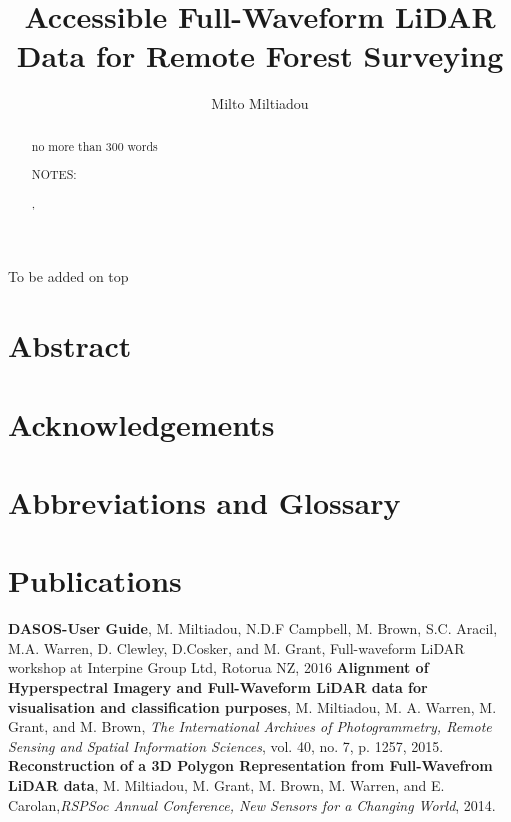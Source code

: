 \documentclass[11pt,nofootinbib]{report}
\title{Accessible Full-Waveform LiDAR Data for Remote Forest Surveying}
\author{Milto Miltiadou}
\begin{document}
	\maketitle
 		
\begin{abstract}	
     no more than 300 words
     
     NOTES:
     \par {\color{blue}{Blue colour: additions according to Neill's feedback}},
     \par {\color{red}{Red colour: notes}}
     \par {\color{gray}{Gray colour: text that is going to be modified }}
     
     \thispagestyle{empty}
\end{abstract}

\newpage
\thispagestyle{empty}
	\setcounter{secnumdepth}{0}
	To be added on top
	\section{Abstract}\label{Abstract}
		
		\thispagestyle{empty}
		\newpage
	\section{Acknowledgements}\label{Acknowledgments}
		
		\thispagestyle{empty}
		\newpage
	

	\section {Abbreviations and Glossary}\label{Abbreviations}
	
	\newpage
	\section{Publications}
		\textbf{DASOS-User Guide}, M. Miltiadou, N.D.F Campbell, M. Brown, S.C. Aracil, M.A. Warren, D. Clewley, D.Cosker, and M. Grant, Full-waveform LiDAR workshop at Interpine Group Ltd, Rotorua NZ, 2016\newline
		\textbf{Alignment of Hyperspectral Imagery and Full-Waveform LiDAR data for visualisation and classification purposes}, M. Miltiadou, M. A. Warren, M. Grant, and M. Brown, \textit{The International Archives of Photogrammetry, Remote Sensing and Spatial Information Sciences}, vol. 40, no. 7, p. 1257, 2015.\newline
		\textbf{Reconstruction of a 3D Polygon Representation from Full-Wavefrom LiDAR data}, M. Miltiadou, M. Grant, M. Brown, M. Warren, and E. Carolan,\textit{RSPSoc Annual Conference, New Sensors for a Changing World}, 2014.\newline
	 
\end{document}
